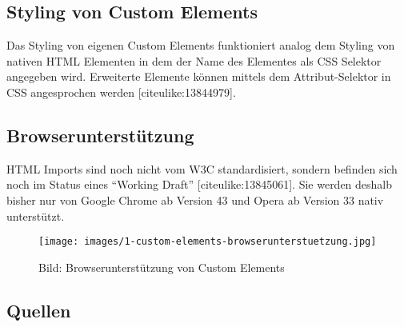 \subsection{Styling von Custom
Elements}\label{styling-von-custom-elements}

Das Styling von eigenen Custom Elements funktioniert analog dem Styling
von nativen HTML Elementen in dem der Name des Elementes als CSS
Selektor angegeben wird. Erweiterte Elemente können mittels dem
Attribut-Selektor in CSS angesprochen werden {[}citeulike:13844979{]}.

\begin{Shaded}
\begin{Highlighting}[]
\KeywordTok{\{}
   \KeywordTok{;}
\KeywordTok{\}}

\CharTok{[is=}\CharTok{]} \KeywordTok{\{}
   \KeywordTok{;}
\KeywordTok{\}}
\end{Highlighting}
\end{Shaded}

\subsection{Browserunterstützung}\label{browserunterstuxfctzung}

HTML Imports sind noch nicht vom W3C standardisiert, sondern befinden
sich noch im Status eines ``Working Draft'' {[}citeulike:13845061{]}.
Sie werden deshalb bisher nur von Google Chrome ab Version 43 und Opera
ab Version 33 nativ unterstützt.

\begin{figure}[htbp]
\centering
\texttt{[image: images/1-custom-elements-browserunterstuetzung.jpg]}
\caption{Bild: Browserunterstützung von Custom Elements}
\end{figure}

\subsection{Quellen}\label{quellen}

